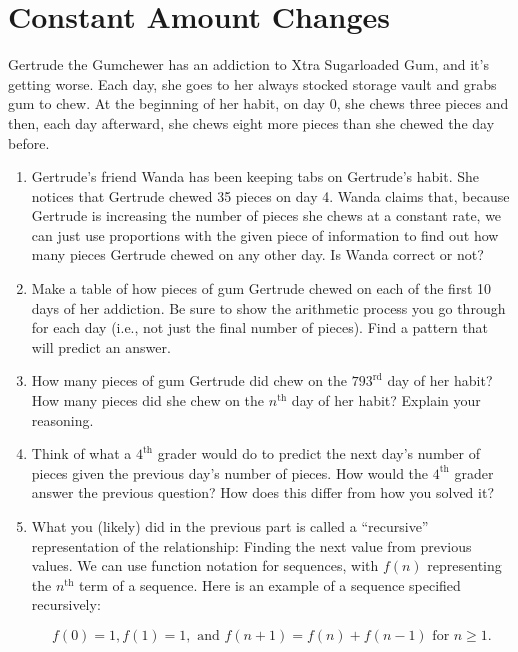 \newpage
\section{Constant Amount Changes}\label{A:ConstantAmount}

\begin{prob}\label{P:gtg1}
Gertrude the Gumchewer has an addiction to Xtra Sugarloaded Gum, and it's getting worse.  Each day, she goes to her always stocked storage vault and grabs gum to chew.  At the beginning of her habit, on day 0, she chews three pieces and then, each day afterward, she chews eight more pieces than she chewed the day before.
\begin{enumerate}
\item Gertrude's friend Wanda has been keeping tabs on Gertrude's habit.  She notices that Gertrude chewed 35 pieces on day 4.  Wanda claims that, because Gertrude is increasing the number of pieces she chews at a constant rate, we can just use proportions with the given piece of information to find out how many pieces Gertrude chewed on any other day.  Is Wanda correct or not?

\item Make a table of how pieces of gum Gertrude chewed on each of the first 10 days of her addiction.  Be sure to show the arithmetic process you go through for each day (i.e., not just the final number of pieces).  Find a pattern that will predict an answer.  

\item How many pieces of gum Gertrude did chew on the $793^\mathrm{rd}$ day of her habit?  How many pieces did she chew on the $n^\mathrm{th}$ day of her habit?  Explain your reasoning.  

\item Think of what a $4^\mathrm{th}$ grader would do to predict the next day's number of pieces given the previous day's number of pieces.  How would the $4^\mathrm{th}$ grader answer the previous question?  How does this differ from how you solved it?

\item What you (likely) did in the previous part is called a ``recursive'' representation of the relationship: Finding the next value from previous values.  We can use function notation for sequences, with $f(n)$ representing the $n^\mathrm{th}$ term of a sequence.  Here is an example of a sequence specified recursively:  

$$f(0) = 1, f(1) = 1,\text{ and }f(n+1) = f(n) + f(n-1)\text{ for }n \ge 1.$$


\end{enumerate}
\end{prob}
